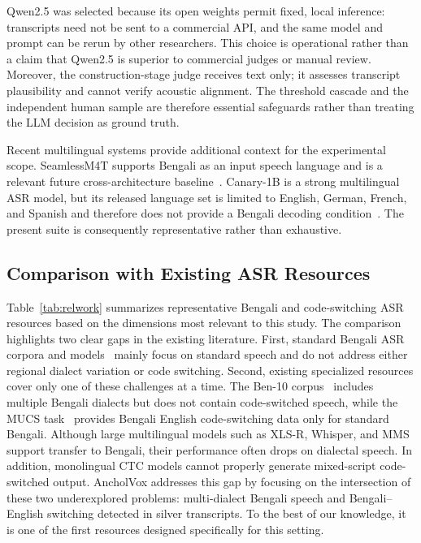 \documentclass[journal]{IEEEtran}
\begin{document}
Qwen2.5 was selected because its open weights permit fixed, local inference:
transcripts need not be sent to a commercial API, and the same model and prompt
can be rerun by other researchers. This choice is operational rather than a
claim that Qwen2.5 is superior to commercial judges or manual review. Moreover,
the construction-stage judge receives text only; it assesses transcript
plausibility and cannot verify acoustic alignment. The threshold cascade and
the independent human sample are therefore essential safeguards rather than
treating the LLM decision as ground truth.

Recent multilingual systems provide additional context for the experimental
scope. SeamlessM4T supports Bengali as an input speech language and is a
relevant future cross-architecture baseline~\cite{seamlessm4t2023}. Canary-1B is
a strong multilingual ASR model, but its released language set is limited to
English, German, French, and Spanish and therefore does not provide a Bengali
decoding condition~\cite{puvvada2024canary}. The present suite is consequently
representative rather than exhaustive.


\subsection{Comparison with Existing ASR Resources}
Table~\ref{tab:relwork} summarizes representative Bengali and code-switching ASR resources based on the dimensions most relevant to this study. The comparison highlights two clear gaps in the existing literature. First, standard Bengali ASR corpora and models~\cite{hasnat2007isolated,swarna2017survey,mandal2020e2e,kjartansson2018bengali} mainly focus on standard speech and do not address either regional dialect variation or code switching. Second, existing specialized resources cover only one of these challenges at a time. The Ben-10 corpus~\cite{ben10_2025} includes multiple Bengali dialects but does not contain code-switched speech, while the MUCS task~\cite{mucs2021} provides Bengali English code-switching data only for standard Bengali. Although large multilingual models such as XLS-R, Whisper, and MMS~\cite{babu2022xlsr,radford2023whisper,pratap2024mms} support transfer to Bengali, their performance often drops on dialectal speech. In addition, monolingual CTC models cannot properly generate mixed-script code-switched output. AncholVox addresses this gap by focusing on the intersection of these two underexplored problems: multi-dialect Bengali speech and Bengali--English switching detected in silver transcripts. To the best of our knowledge, it is one of the first resources designed specifically for this setting.
\end{document}
